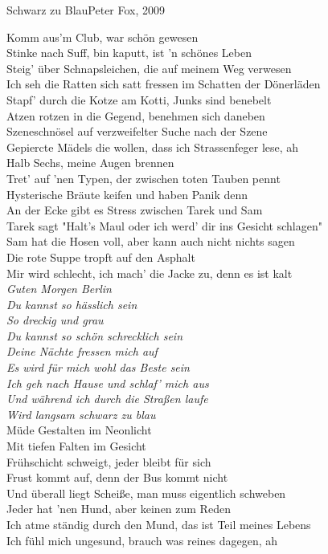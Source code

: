 
\begin{lied}{Schwarz zu Blau}{Peter Fox, 2009}

Komm aus'm Club, war schön gewesen\\
Stinke nach Suff, bin kaputt, ist 'n schönes Leben\\
Steig' über Schnapsleichen, die auf meinem Weg verwesen\\
Ich seh die Ratten sich satt fressen im Schatten der Dönerläden\\
Stapf' durch die Kotze am Kotti, Junks sind benebelt\\
Atzen rotzen in die Gegend, benehmen sich daneben\\
Szeneschnösel auf verzweifelter Suche nach der Szene\\
Gepiercte Mädels die wollen, dass ich Strassenfeger lese, ah\\

Halb Sechs, meine Augen brennen\\
Tret' auf 'nen Typen, der zwischen toten Tauben pennt\\
Hysterische Bräute keifen und haben Panik denn\\
An der Ecke gibt es Stress zwischen Tarek und Sam\\
Tarek sagt "Halt's Maul oder ich werd' dir ins Gesicht schlagen"\\
Sam hat die Hosen voll, aber kann auch nicht nichts sagen\\
Die rote Suppe tropft auf den Asphalt\\
Mir wird schlecht, ich mach' die Jacke zu, denn es ist kalt\\

\textit{Guten Morgen Berlin\\
Du kannst so hässlich sein\\
So dreckig und grau\\
Du kannst so schön schrecklich sein\\
Deine Nächte fressen mich auf\\
Es wird für mich wohl das Beste sein\\
Ich geh nach Hause und schlaf' mich aus\\
Und während ich durch die Straßen laufe\\
Wird langsam schwarz zu blau}\\

Müde Gestalten im Neonlicht\\
Mit tiefen Falten im Gesicht\\
Frühschicht schweigt, jeder bleibt für sich\\
Frust kommt auf, denn der Bus kommt nicht\\
Und überall liegt Scheiße, man muss eigentlich schweben\\
Jeder hat 'nen Hund, aber keinen zum Reden\\
Ich atme ständig durch den Mund, das ist Teil meines Lebens\\
Ich fühl mich ungesund, brauch was reines dagegen, ah\\


\end{lied}
